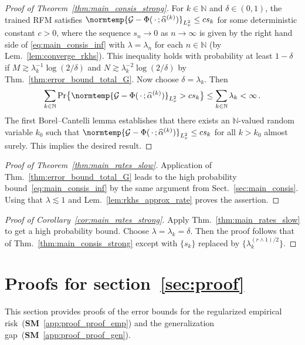 \documentclass{article}
\theoremstyle{plain}
\theoremstyle{my_def}
\theoremstyle{my_rem}
\numberwithin{equation}{section}
\numberwithin{theorem}{section}%
\newcommand{\N}{\mathbb{N}}
\newcommand{\cG}{\mathcal{G}}
\newcommand{\norm}{\normtemp}
\renewcommand{\hat}{\widehat}
\newcommand{\slot}{{\,\cdot\,}}
\newcommand{\mmin}{\wedge} %
\newcommand{\al}{\alpha}
\newcommand{\alhat}{\hat{\al}}
\begin{document}
\begin{proof}[Proof of Theorem~\ref{thm:main_consis_strong}]
    For $k\in\N$ and $\delta\in (0,1)$, the trained RFM satisfies $\norm{\cG - \Phi(\slot;\alhat^{(k)})}_{L^2_\nu}\leq c s_k$ for some deterministic constant $c>0$, where the sequence $s_n\to 0$ as $n\to\infty$ is given by the right hand side of \eqref{eq:main_consis_inf} with $\lambda=\lambda_n$ for each $n\in\N$ (by Lem.~\ref{lem:converge_rkhs}). This inequality holds with probability at least $1-\delta$ if $M\gtrsim \lambda_k^{-1}\log(2/\delta)$ and $N\gtrsim \lambda_k^{-2}\log(2/\delta)$ by Thm.~\ref{thm:error_bound_total_G}. Now choose $\delta = \lambda_k$. Then
    \begin{equation*}
        \sum_{k\in\N}\Pr\bigl\{ \norm{\cG - \Phi(\slot;\alhat^{(k)})}_{L^2_\nu} > c s_k \bigr\}\leq \sum_{k\in\N}\lambda_k<\infty\,.
    \end{equation*}
    The first Borel--Cantelli lemma establishes that there exists an $\N$-valued random variable $k_0$ such that $\norm{\cG - \Phi(\slot;\alhat^{(k)})}_{L^2_\nu}\leq cs_k$ for all $k>k_0$ almost surely. This implies the desired result.
\end{proof}

\begin{proof}[Proof of Theorem~\ref{thm:main_rates_slow}]
    Application of Thm.~\ref{thm:error_bound_total_G} leads to the high probability bound~\eqref{eq:main_consis_inf} by the same argument from Sect.~\ref{sec:main_consis}. Using that $\lambda\lesssim 1$ and Lem.~\ref{lem:rkhs_approx_rate} proves the assertion.
\end{proof}

\begin{proof}[Proof of Corollary~\ref{cor:main_rates_strong}]
    Apply Thm.~\ref{thm:main_rates_slow} to get a high probability bound. Choose $\lambda=\lambda_k=\delta$. Then the proof follows that of Thm.~\ref{thm:main_consis_strong} except with $\{s_k\}$ replaced by $\{\lambda_k^{(r\mmin 1)/2}\}$.
\end{proof}

\section{Proofs for section~\ref{sec:proof}}\label{app:proof_proof}
This section provides proofs of the error bounds for the regularized empirical risk~({\bf SM}~\ref{app:proof_proof_emp}) and the generalization gap~({\bf SM}~\ref{app:proof_proof_gen}).
\end{document}
